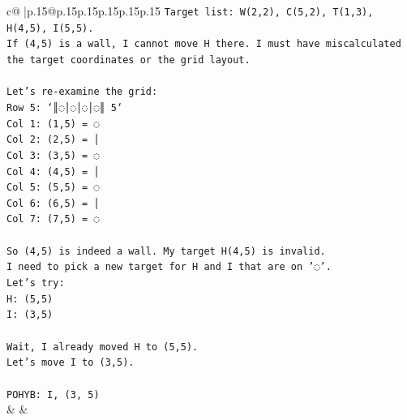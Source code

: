 \documentclass{article}
\begin{document}
{\begin{supertabular}{c@{$\;$}|p{.15\linewidth}@{}p{.15\linewidth}p{.15\linewidth}p{.15\linewidth}p{.15\linewidth}p{.15\linewidth}}
{{{\texttt{Target list: W(2,2), C(5,2), T(1,3), H(4,5), I(5,5).} \\
\texttt{If (4,5) is a wall, I cannot move H there. I must have miscalculated the target coordinates or the grid layout.} \\
\\ 
\texttt{Let's re{-}examine the grid:} \\
\texttt{Row 5: `║◌│◌│◌│◌║ 5`} \\
\texttt{Col 1: (1,5) = ◌} \\
\texttt{Col 2: (2,5) = │} \\
\texttt{Col 3: (3,5) = ◌} \\
\texttt{Col 4: (4,5) = │} \\
\texttt{Col 5: (5,5) = ◌} \\
\texttt{Col 6: (6,5) = │} \\
\texttt{Col 7: (7,5) = ◌} \\
\\ 
\texttt{So (4,5) is indeed a wall. My target H(4,5) is invalid.} \\
\texttt{I need to pick a new target for H and I that are on '◌'.} \\
\texttt{Let's try:} \\
\texttt{H: (5,5)} \\
\texttt{I: (3,5)} \\
\\ 
\texttt{Wait, I already moved H to (5,5).} \\
\texttt{Let's move I to (3,5).} \\
\\ 
\texttt{POHYB: I, (3, 5)} \\
            }
        }
    }
    & & \\ \\


\end{supertabular}}
\end{document}
